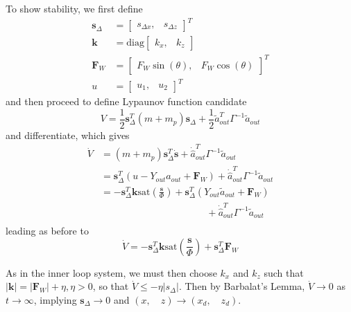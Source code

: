 \documentclass[letterpaper, 10 pt, conference]{ieeeconf}\usepackage[margin=1in]{geometry}
\begin{document}
To show stability, we first define 
\begin{align*}
	\mathbf{s}_\Delta &= \begin{bmatrix}
	s_{\Delta x}, & s_{\Delta z}
\end{bmatrix}^T \\
	\mathbf{k} &= \text{diag}\begin{bmatrix}
	k_x, & k_z
\end{bmatrix} \\
	\mathbf{F}_W &= \begin{bmatrix}
	F_W \sin(\theta), & F_W \cos(\theta)\end{bmatrix}^T \\
	u &= \begin{bmatrix}
		u_1, & u_2
	\end{bmatrix}^T
\end{align*}
and then proceed to define Lypaunov function candidate
\begin{equation}
	V = \frac{1}{2}\mathbf{s}_{\Delta}^T (m+m_p) \mathbf{s}_{\Delta} + \frac{1}{2}\tilde{a}_{out}^T \Gamma^{-1} \tilde{a}_{out}
\end{equation}
and differentiate, which gives
\begin{align*}
	\dot V &= (m+m_p) \mathbf{s}_\Delta^T \dot{\mathbf{s}} + \dot{\hat{a}}_{out}^T \Gamma^{-1} \tilde{a}_{out} \\
	~ &= \mathbf{s}_\Delta^T (u - Y_{out} a_{out} + \mathbf{F}_W)  + \dot{\hat{a}}_{out}^T \Gamma^{-1} \tilde{a}_{out} \\
	~ &= -\mathbf{s}_\Delta^T \mathbf{k} \text{sat}\left(\frac{\mathbf{s}}{\Phi}\right) + \mathbf{s}_\Delta^T(Y_{out} \tilde{a}_{out} + \mathbf{F}_W) \\
	~ & \qquad ~\qquad ~ \qquad~ \qquad ~\qquad + \dot{\hat{a}}_{out}^T \Gamma^{-1} \tilde{a}_{out}\\
\end{align*}
leading as before to 
\begin{equation}
	\dot{V} = -\mathbf{s}_\Delta^T \mathbf{k} \text{sat}\left(\frac{\mathbf{s}}{\Phi}\right) + \mathbf{s}_\Delta^T \mathbf{F}_W
\end{equation}

As in the inner loop system, we must then choose $k_x$ and $k_z$ such that $|\mathbf{k}| = |\mathbf{F}_W| + \eta, \eta > 0$, so that $\dot{V} \leq -\eta |s_{\Delta}|$. Then by Barbalat's Lemma, $\dot{V} \rightarrow 0$ as $t \rightarrow \infty$, implying $\mathbf{s}_{\Delta} \rightarrow 0$ and $(x,\quad z) \rightarrow (x_d,\quad z_d)$. 
\end{document}
